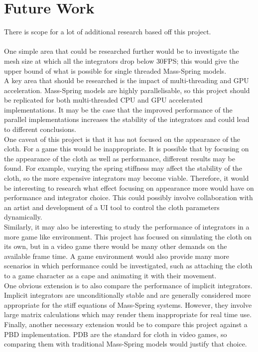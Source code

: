 \section{Future Work}
There is scope for a lot of additional research based off this project.
\\\\One simple area that could be researched further would be to investigate the mesh size at which all the integrators drop below 30FPS; this would give the upper bound of what is possible for single threaded Mass-Spring models.
\\A key area that should be researched is the impact of multi-threading and GPU acceleration. Mass-Spring models are highly parallelisable, so this project should be replicated for both multi-threaded CPU and GPU accelerated implementations. It may be the case that the improved performance of the parallel implementations increases the stability of the integrators and could lead to different conclusions.
\\One caveat of this project is that it has not focused on the appearance of the cloth. For a game this would be inappropriate. It is possible that by focusing on the appearance of the cloth as well as performance, different results may be found. For example, varying the spring stiffness may affect the stability of the cloth, so the more expensive integrators may become viable. Therefore, it would be interesting to research what effect focusing on appearance more would have on performance and integrator choice. This could possibly involve collaboration with an artist and development of a UI tool to control the cloth parameters dynamically.
\\Similarly, it may also be interesting to study the performance of integrators in a more game like environment. This project has focused on simulating the cloth on its own, but in a video game there would be many other demands on the available frame time. A game environment would also provide many more scenarios in which performance could be investigated, such as attaching the cloth to a game character as a cape and animating it with their movement.
\\One obvious extension is to also compare the performance of implicit integrators. Implicit integrators are unconditionally stable and are generally considered more appropriate for the stiff equations of Mass-Spring systems. However, they involve large matrix calculations which may render them inappropriate for real time use.
\\Finally, another necessary extension would be to compare this project against a PBD implementation. PDB are the standard for cloth in video games, so comparing them with traditional Mass-Spring models would justify that choice.